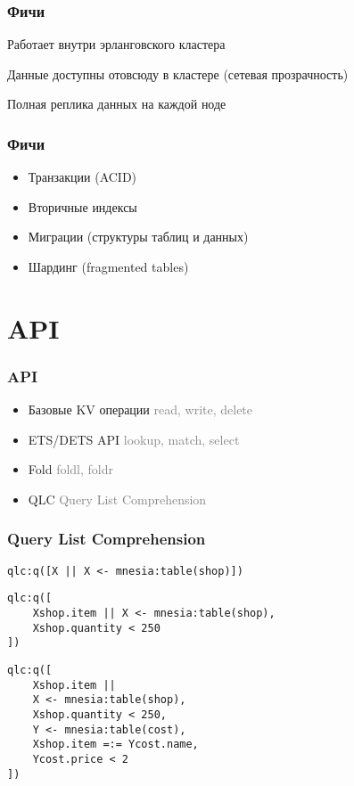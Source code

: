 \documentclass[10pt]{beamer}
\begin{document}
\begin{frame}
\frametitle{Фичи}
\centering
Работает внутри эрланговского кластера
\par
\bigskip
Данные доступны отовсюду в кластере (сетевая прозрачность)
\par
\bigskip
Полная реплика данных на каждой ноде
\end{frame}

\begin{frame}
\frametitle{Фичи}
\begin{itemize}
\item Транзакции (ACID)
\item Вторичные индексы
\item Миграции (структуры таблиц и данных)
\item Шардинг (fragmented tables)
\end{itemize}
\end{frame}

\section{API}

\begin{frame}
\frametitle{API}
\begin{itemize}[<+->]
\item Базовые KV операции\newline
  \textcolor{gray}{read, write, delete}
\item ETS/DETS API\newline
  \textcolor{gray}{lookup, match, select}
\item Fold\newline
  \textcolor{gray}{foldl, foldr}
\item QLC\newline
  \textcolor{gray}{Query List Comprehension}
\end{itemize}
\end{frame}

\begin{frame}[fragile]
\frametitle{Query List Comprehension}
\begin{lstlisting}
qlc:q([X || X <- mnesia:table(shop)])
\end{lstlisting}
\begin{lstlisting}
qlc:q([
    Xshop.item || X <- mnesia:table(shop),
    Xshop.quantity < 250
])
\end{lstlisting}
\begin{lstlisting}
qlc:q([
    Xshop.item ||
    X <- mnesia:table(shop),
    Xshop.quantity < 250,
    Y <- mnesia:table(cost),
    Xshop.item =:= Ycost.name,
    Ycost.price < 2
])
\end{lstlisting}
\end{frame}
\end{document}
